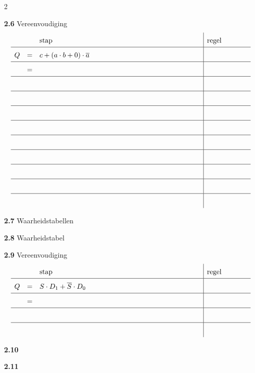 \documentclass[a4paper,12pt]{paper}
\begin{document}
\begin{multicols}{2}
\begin{tcolorbox}
\textbf{2.6} Vereenvoudiging
\[
{\renewcommand{\arraystretch}{1.7}
\begin{array}{rcl|p{2cm}}
&&{\text{stap}} & \text{regel} \\\hline
Q & = & c + (a\cdot b + 0) \cdot \overline{a}   \\\hline
    & = &   \hspace{8cm}              & \\\hline
    &  &   & \\\hline    
    &  &   & \\\hline
     &  &   & \\\hline    
    &  &   & \\\hline
        &  &   & \\\hline    
    &  &   & \\\hline
        &  &   & \\\hline    
    &  &   & \\\hline
                        &  &   & 
\end{array}}
\]

\vspace{6.98cm}
\end{tcolorbox}

\begin{tcolorbox}
\textbf{2.7} Waarheidstabellen
\vspace{18.5cm}
\end{tcolorbox}


\begin{tcolorbox}
\textbf{2.8} Waarheidstabel
\vspace{12.66cm}
\end{tcolorbox}



\begin{tcolorbox}
\textbf{2.9} Vereenvoudiging
\[
{\renewcommand{\arraystretch}{1.7}
\begin{array}{rcl|p{2cm}}
&&{\text{stap}} & \text{regel} \\\hline
Q & = & S\cdot D_1 + \overline{S} \cdot D_0  \\\hline
    & = &   \hspace{8cm}              & \\\hline
    &  &   & \\\hline    
                        &  &   & 
\end{array}}
\]
\end{tcolorbox}

\begin{tcolorbox}
\textbf{2.10} 
\vspace{18.76cm}
\end{tcolorbox}

\end{multicols}

\begin{tcolorbox}
\textbf{2.11} 
\vspace{18.76cm}
\end{tcolorbox}
\end{document}
